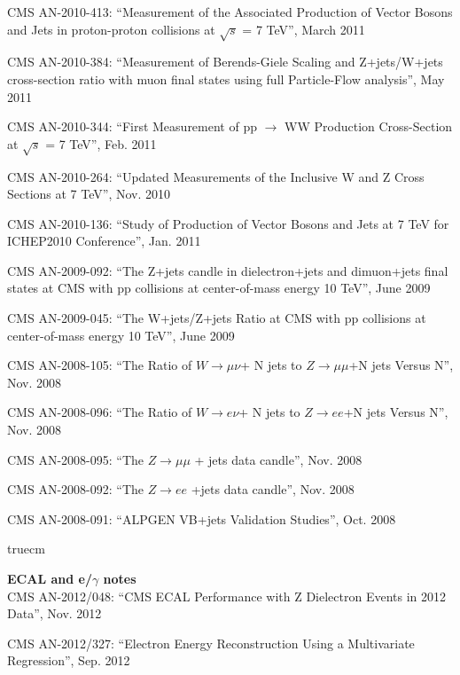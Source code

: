 CMS AN-2010-413: ``Measurement of the Associated Production of Vector Bosons and Jets in proton-proton collisions at $\sqrt{s}$ = 7 TeV'', March 2011

CMS AN-2010-384: ``Measurement of Berends-Giele Scaling and Z+jets/W+jets cross-section ratio with muon final states using full Particle-Flow analysis'', May 2011

CMS AN-2010-344: ``First Measurement of pp $\to$ WW Production Cross-Section at $\sqrt{s}$ = 7 TeV'', Feb. 2011

CMS AN-2010-264: ``Updated Measurements of the Inclusive W and Z Cross Sections at 7 TeV'', Nov. 2010

CMS AN-2010-136: ``Study of Production of Vector Bosons and Jets at 7 TeV for ICHEP2010 Conference'', Jan. 2011

CMS AN-2009-092: ``The Z+jets candle in dielectron+jets and dimuon+jets final states at CMS with pp collisions at center-of-mass energy 10 TeV'', June 2009

CMS AN-2009-045: ``The W+jets/Z+jets Ratio at CMS with pp collisions at center-of-mass energy 10 TeV'', June 2009

CMS AN-2008-105: ``The Ratio of $W\to\mu\nu$+ N jets to $Z\to\mu\mu$+N jets Versus N'', Nov. 2008

CMS AN-2008-096: ``The Ratio of $W\to e\nu$+ N jets to $Z\to ee$+N jets Versus N'', Nov. 2008

CMS AN-2008-095: ``The $Z\to\mu\mu$ + jets data candle'', Nov. 2008

CMS AN-2008-092: ``The $Z\to ee$ +jets data candle'', Nov. 2008

CMS AN-2008-091: ``ALPGEN VB+jets Validation Studies'', Oct. 2008





 truecm

        {\bf ECAL and e/$\gamma$ notes}
        \\    
CMS AN-2012/048: ``CMS ECAL Performance with Z Dielectron Events in 2012 Data'', Nov. 2012

CMS AN-2012/327: ``Electron Energy Reconstruction Using a Multivariate Regression'', Sep. 2012

